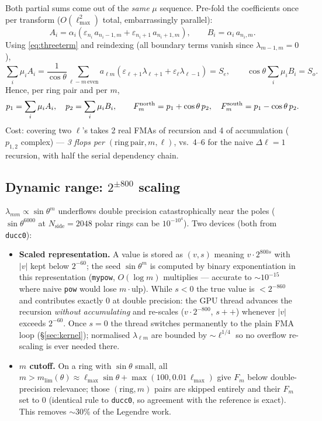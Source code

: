 \documentclass[11pt]{article}
\newcommand{\eps}{\varepsilon}
\newcommand{\lm}{\lambda_{\ell m}}
\newcommand{\cth}{\cos\theta}
\newcommand{\sth}{\sin\theta}
\begin{document}
Both partial sums come out of the \emph{same} $\mu$ sequence.  Pre-fold the
coefficients once per transform ($O(\ell_{\max}^2)$ total, embarrassingly
parallel):
\begin{equation}
A_i = \alpha_i\left(\eps_{n_i}\, a_{n_i-1,m} + \eps_{n_i+1}\, a_{n_i+1,m}\right),
\qquad
B_i = \alpha_i\, a_{n_i,m} .
\label{eq:prefold}
\end{equation}
Using \eqref{eq:threeterm} and reindexing (all boundary terms vanish since
$\lambda_{m-1,m}=0$),
\begin{equation}
\sum_i \mu_i A_i
 = \frac{1}{\cth}\sum_{\ell-m\,\mathrm{even}} a_{\ell m}
   \left(\eps_{\ell+1}\lambda_{\ell+1} + \eps_{\ell}\lambda_{\ell-1}\right)
 = S_e,
\qquad
\cth \sum_i \mu_i B_i = S_o .
\end{equation}
Hence, per ring pair and per $m$,
\begin{equation}
p_1 = \sum_i \mu_i A_i,\quad p_2 = \sum_i \mu_i B_i,
\qquad
F_m^{\rm north} = p_1 + \cth\, p_2,\quad
F_m^{\rm south} = p_1 - \cth\, p_2 .
\end{equation}
Cost: covering two $\ell$'s takes 2 real FMAs of recursion and 4 of
accumulation ($p_{1,2}$ complex) --- \emph{3 flops per $(\mathrm{ring\,pair},
m,\ell)$}, vs.\ 4--6 for the naive $\Delta\ell=1$ recursion, with half the
serial dependency chain.

\subsection{Dynamic range: $2^{\pm 800}$ scaling}
\label{sec:scaling}

$\lambda_{mm} \propto \sth^m$ underflows double precision catastrophically
near the poles ($\sth^{6000}$ at $N_\mathrm{side}=2048$ polar rings can be
$10^{-10^{4}}$).  Two devices (both from \texttt{ducc0}):

\begin{itemize}
\item \textbf{Scaled representation.}  A value is stored as
  $(v, s)$ meaning $v \cdot 2^{800 s}$ with $|v|$ kept below
  $2^{-60}$; the seed $\sth^m$ is computed by binary exponentiation in this
  representation (\texttt{mypow}, $O(\log m)$ multiplies --- accurate to
  $\sim\!10^{-15}$ where naive \texttt{pow} would lose $m\cdot$ulp).  While
  $s<0$ the true value is $< 2^{-860}$ and contributes exactly $0$ at double
  precision: the GPU thread advances the recursion \emph{without
  accumulating} and re-scales ($v\!\cdot\!2^{-800}$, $s{+}{+}$) whenever
  $|v|$ exceeds $2^{-60}$.  Once $s=0$ the thread switches permanently to
  the plain FMA loop (\S\ref{sec:kernel}); normalised $\lm$ are bounded by
  $\sim\!\ell^{1/4}$ so no overflow re-scaling is ever needed there.
\item \textbf{$m$ cutoff.}  On a ring with $\sth$ small, all $m >
  m_\mathrm{lim}(\theta) \approx \ell_{\max}\sth + \max(100,
  0.01\,\ell_{\max})$ give $F_m$ below double-precision relevance; those
  $(\mathrm{ring},m)$ pairs are skipped entirely and their $F_m$ set to $0$
  (identical rule to \texttt{ducc0}, so agreement with the reference is
  exact).  This removes $\sim 30\%$ of the Legendre work.
\end{itemize}
\end{document}
